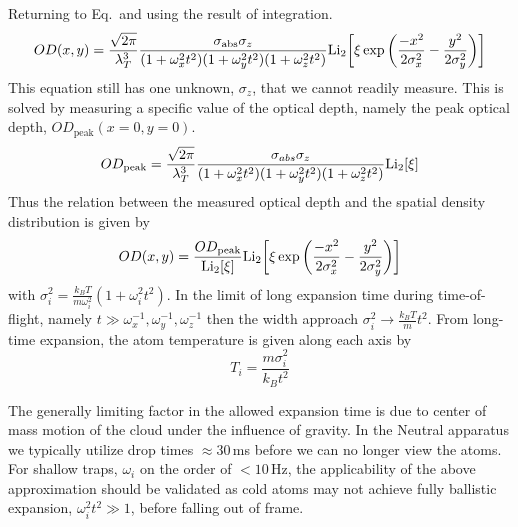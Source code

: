 Returning to Eq.\,\label{eq:thermalFit} and using the result of integration.
\begin{equation}
	OD(x,y) = \frac{\sqrt{2\pi}}{\lambda_T^3}\frac{\sigma_{\text{abs}} \sigma_z}{(1+\omega_x^2t^2)(1+\omega_y^2t^2)(1+\omega_z^2t^2)} \text{Li}_{2}\!\left[ \xi\,\text{exp}\left( {\frac{-x^2}{2\sigma_x^2} - \frac{y^2}{2\sigma_y^2}} \right) \right]
\end{equation}
This equation still has one unknown, $\sigma_z$, that we cannot readily measure.
This is solved by measuring a specific value of the optical depth, namely the peak optical depth, $OD_\text{peak}(x=0,y=0)$.
\begin{equation}
	OD_{\text{peak}} = \frac{\sqrt{2\pi}}{\lambda_T^3}\frac{\sigma_{abs} \sigma_z}{(1+\omega_x^2t^2)(1+\omega_y^2t^2)(1+\omega_z^2t^2)} \text{Li}_{2}\!\left[ \xi \right]
\end{equation}
Thus the relation between the measured optical depth and the spatial density distribution is given by
\begin{equation} \label{eq:OD}
	OD(x,y) = \frac{OD_{\text{peak}}}{\text{Li}_{2}\!\left[ \xi \right]}\text{Li}_{2}\!\left[ \xi\,\text{exp}\left( {\frac{-x^2}{2\sigma_x^2} - \frac{y^2}{2\sigma_y^2}} \right) \right]
\end{equation}
with $\sigma_i^2 = \frac{k_BT}{m\omega_i^2}(1+\omega_i^2t^2)$.
In the limit of long expansion time during time-of-flight, namely $t \gg \omega_x^{-1}, \omega_y^{-1}, \omega_z^{-1}$ then the width approach $\sigma_i^2\rightarrow\frac{k_BT}{m}t^2$.
From long-time expansion, the atom temperature is given along each axis by
\begin{equation}
	T_i=\frac{m \sigma_i^2}{k_Bt^2}
\end{equation}

The generally limiting factor in the allowed expansion time is due to center of mass motion of the cloud under the influence of gravity. 
In the Neutral apparatus we typically utilize drop times $\approx 30$\,ms before we can no longer view the atoms.
For shallow traps, $\omega_i$ on the order of $<10$\,Hz, the applicability of the above approximation should be validated as cold atoms may not achieve fully ballistic expansion, $\omega_i^2t^2 \gg 1$, before falling out of frame.

